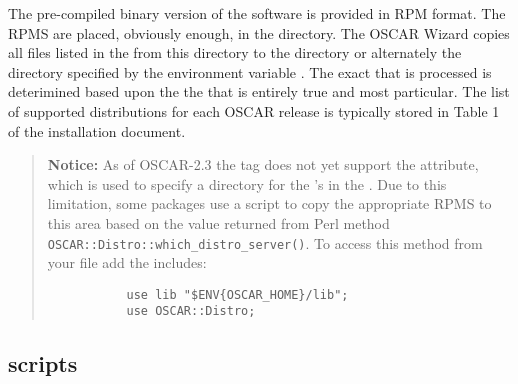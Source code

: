 The pre-compiled binary version of the software is provided in RPM format.
The RPMS are placed, obviously enough, in the  directory.
The OSCAR Wizard copies all files listed in the  from this
 directory to the  directory or
alternately the directory specified by the environment variable
.   The exact  that is processed is
deterimined based upon the the  that is entirely true and
most particular.  The list of supported distributions for each OSCAR
release is typically stored in Table 1 of the installation document.


\begin{verse}
   {\bfseries Notice: } As of OSCAR-2.3 the  tag does not yet
   support the  attribute, which is used to specify a
   directory for the 's in the .  Due to this
   limitation, some packages use a  script to copy the
   appropriate RPMS to this  area based on the value
   returned from Perl method \verb=OSCAR::Distro::which_distro_server()=.
   To access this method from your  file add the
   includes: 
   \begin{verbatim}
           use lib "$ENV{OSCAR_HOME}/lib";
           use OSCAR::Distro;
   \end{verbatim}
\end{verse}




\subsection{scripts}
\label{sect:pkg-scripts}

